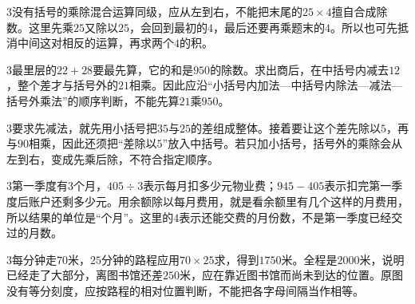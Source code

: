 \documentclass[multi=snippet,border={5bp 20bp 5bp 5bp}]{standalone}
\newenvironment{snippet}[3]{\begin{minipage}{#1bp}\color{answerred}\fontsize{#2}{#3}\selectfont\raggedright}{\end{minipage}}
\begin{document}
\begin{snippet}{505}{11.5}{14}\begin{multicols}{3}\raggedcolumns 没有括号的乘除混合运算同级，应从左到右，不能把末尾的\(25\times4\)\allowbreak 擅自合成除数。这里先乘\(25\)\allowbreak 又除以\(25\)\allowbreak ，会回到最初的\(4\)\allowbreak ，最后还要再乘题末的\(4\)\allowbreak 。所以也可先抵消中间这对相反的运算，再求两个\(4\)\allowbreak 的积。\end{multicols}\end{snippet}
\begin{snippet}{505}{11.5}{14}\begin{multicols}{3}\raggedcolumns 最里层的\(22+28\)\allowbreak 要最先算，它的和是\(950\)\allowbreak 的除数。求出商后，在中括号内减去\(12\)\allowbreak ，整个差才与括号外的\(21\)\allowbreak 相乘。因此应沿“小括号内加法—中括号内除法—减法—括号外乘法”的顺序判断，不能先算\(21\)\allowbreak 乘\(950\)\allowbreak 。\end{multicols}\end{snippet}
\begin{snippet}{505}{11.5}{14}\begin{multicols}{3}\raggedcolumns 要求先减法，就先用小括号把\(35\)\allowbreak 与\(25\)\allowbreak 的差组成整体。接着要让这个差先除以\(5\)\allowbreak ，再与\(90\)\allowbreak 相乘，因此还须把“差除以\(5\)\allowbreak ”放入中括号。若只加小括号，括号外的乘除会从左到右，变成先乘后除，不符合指定顺序。\end{multicols}\end{snippet}
\begin{snippet}{505}{11.5}{14}\begin{multicols}{3}\raggedcolumns 第一季度有\(3\)\allowbreak 个月，\(405\div3\)\allowbreak 表示每月扣多少元物业费；\(945-405\)\allowbreak 表示扣完第一季度后账户还剩多少元。用余额除以每月费用，就是看余额里有几个这样的月费用，所以结果的单位是“个月”。这里的\(4\)\allowbreak 表示还能交费的月份数，不是第一季度已经交过的月数。\end{multicols}\end{snippet}
\begin{snippet}{505}{11.5}{14}\begin{multicols}{3}\raggedcolumns 每分钟走\(70\)\allowbreak 米，\(25\)\allowbreak 分钟的路程应用\(70\times25\)\allowbreak 求，得到\(1750\)\allowbreak 米。全程是\(2000\)\allowbreak 米，说明已经走了大部分，离图书馆还差\(250\)\allowbreak 米，应在靠近图书馆而尚未到达的位置。原图没有等分刻度，应按路程的相对位置判断，不能把各字母间隔当作相等。\end{multicols}\end{snippet}
\end{document}
